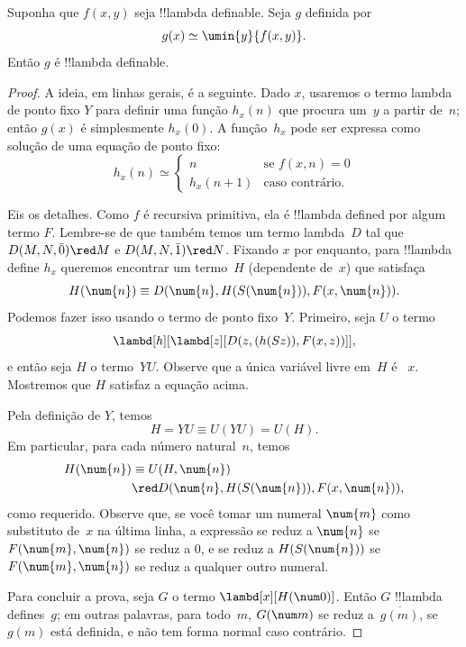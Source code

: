 \documentclass[../../../include/open-logic-section]{subfiles}
\begin{document}

\begin{lem}
Suponha que $f(x,y)$ seja !!{lambda definable}. Seja $g$ definida por
\[
g(x) \simeq \umin{y}{f(x,y)}.
\]
Então $g$ é !!{lambda definable}.
\end{lem}

\begin{proof}
A ideia, em linhas gerais, é a seguinte. Dado $x$, usaremos o termo lambda
de ponto fixo $Y$ para definir uma função $h_x(n)$ que procura um~$y$ a
partir de~$n$; então $g(x)$ é simplesmente $h_x(0)$. A função~$h_x$ pode
ser expressa como solução de uma equação de ponto fixo:
\[
h_x(n) \simeq
\begin{cases}
n & \text{se $f(x,n) = 0$} \\
h_x(n+1) & \text{caso contrário.}
\end{cases}
\]

Eis os detalhes. Como $f$ é recursiva primitiva, ela é !!{lambda defined}
por algum termo $F$. Lembre-se de que também temos um termo lambda~$D$ tal
que $D(M, N, \bar{0}) \red M$ e $D(M, N, \bar{1}) \red N$. Fixando $x$
por enquanto, para !!{lambda define} $h_x$ queremos encontrar um termo~$H$
(dependente de~$x$) que satisfaça
\[
H(\num{n}) \equiv D(\num{n}, H(S(\num{n})), F(x, \num{n})).
\]
Podemos fazer isso usando o termo de ponto fixo~$Y$. Primeiro, seja $U$ o
termo
\[
\lambd[h][\lambd[z][D(z,(h(Sz)),F(x,z))]],
\]
e então seja $H$ o termo~$YU$. Observe que a única variável livre em~$H$ é
~$x$. Mostremos que $H$ satisfaz a equação acima.

Pela definição de $Y$, temos
\[
H = YU \equiv U(YU) = U(H).
\]
Em particular, para cada número natural~$n$, temos
\begin{align*}
H(\num{n}) & \equiv U(H, \num{n}) \\
& \red D(\num{n}, H(S(\num{n})), F(x, \num{n})),
\end{align*}
como requerido. Observe que, se você tomar um numeral $\num{m}$ como substituto de~$x$
na última linha, a expressão se reduz a $\num{n}$ se
$F(\num{m}, \num{n})$ se reduz a $\num{0}$, e se reduz a
$H(S(\num{n}))$ se $F(\num{m}, \num{n})$ se reduz a qualquer outro
numeral.

Para concluir a prova, seja $G$ o termo $\lambd[x][H(\num 0)]$. Então $G$
!!{lambda define}s~$g$; em outras palavras, para todo~$m$, $G(\num m)$ se
reduz a~$\overline {g(m)}$, se $g(m)$ está definida, e não tem forma normal
caso contrário.
\end{proof}
\end{document}
